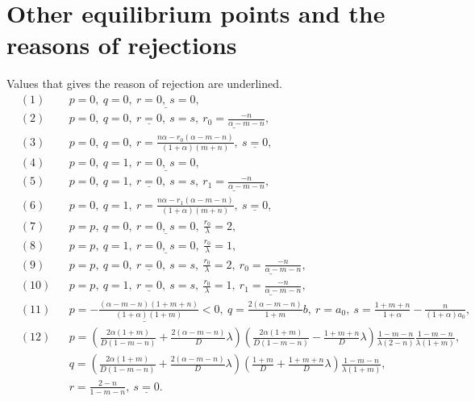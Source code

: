 \documentclass[a4paper,11pt]{article}
\theoremstyle{remark}
\begin{document}
\section{Other equilibrium points and the reasons of rejections}\label{append:equi_reject}
Values that gives the reason of rejection are underlined.
\begin{align*}
 &(1) & & p=0, \ q=0, \ \underline{ r=0, \ s=0},\\
 &(2) & & p=0, \ q=0, \ \underline{ r=0},\ s=s, \ \underline{ r_0 = \frac{-n}{\alpha-m-n}},\\
 &(3) & & p=0, \ q=0, \ r = \frac{n\alpha - r_0(\alpha-m-n)}{(1+\alpha)(m+n)},\ \underline{ s=0},\\
 &(4) & & p=0, \ q=1, \ \underline{ r=0, \ s=0}, \\
 &(5) & & p=0, \ q=1, \ \underline{ r=0},\ s=s, \ \underline{ r_1 = \frac{-n}{\alpha-m-n}},\\
 &(6) & & p=0, \ q=1, \ r = \frac{n\alpha - r_1(\alpha-m-n)}{(1+\alpha)(m+n)},\ \underline{ s=0},\\
 &(7) & & p=p, \ q=0, \ \underline{ r=0, \ s=0}, \ \frac{r_0}{\lambda}=2, \\
 &(8) & & p=p, \ q=1, \ \underline{ r=0, \ s=0}, \ \frac{r_0}{\lambda}=1, \\
 &(9) & & p=p, \ q=0, \ \underline{ r=0}, \ s=s, \ \frac{r_0}{\lambda}=2, \ \underline{ r_0 = \frac{-n}{\alpha-m-n}}, \\
 &(10) & & p=p, \ q=1, \ \underline{ r=0}, \ s=s, \ \frac{r_0}{\lambda}=1, \ \underline{ r_1 = \frac{-n}{\alpha-m-n}}, \\
 &(11) & & \underline{ p=-\frac{(\alpha-m-n)(1+m+n)}{(1+\alpha)(1+m)}<0}, \ q=\frac{2(\alpha-m-n)}{1+m}b, \ r=a_0, \ s=\frac{1+m+n}{1+\alpha} - \frac{n}{(1+\alpha)a_0},\\
 &(12) & & p=\left( \frac{2\alpha(1+m)}{D(1-m-n)} + \frac{2(\alpha-m-n)}{D}\lambda\right)\left(\frac{2\alpha(1+m)}{D(1-m-n)} - \frac{1+m+n}{D}\lambda\right)\frac{1-m-n}{\lambda(2-n)}\frac{1-m-n}{\lambda(1+m)}, \\
 & & &q=\left( \frac{2\alpha(1+m)}{D(1-m-n)} + \frac{2(\alpha-m-n)}{D}\lambda\right)\left(\frac{1+m}{D} + \frac{1+m+n}{D}\lambda\right)\frac{1-m-n}{\lambda(1+m)},\\
 & & &r = \frac{2-n}{1-m-n}, \ \underline{ s=0}.
\end{align*}
\end{document}
